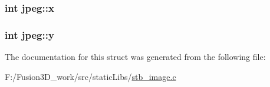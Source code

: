 \subsubsection[{x}]{\setlength{\rightskip}{0pt plus 5cm}int jpeg\+::x}\label{structjpeg_aa32cf2da11f9b410615218fe5feed7ff}
\hypertarget{structjpeg_a4e525a4b804fd232c71653239e9ff4fc}{}
\subsubsection[{y}]{\setlength{\rightskip}{0pt plus 5cm}int jpeg\+::y}\label{structjpeg_a4e525a4b804fd232c71653239e9ff4fc}


The documentation for this struct was generated from the following file\+:\begin{DoxyCompactItemize}
\item 
F\+:/\+Fusion3\+D\+\_\+work/src/static\+Libs/\hyperlink{stb__image_8c}{stb\+\_\+image.\+c}\end{DoxyCompactItemize}
